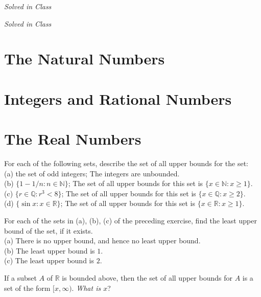 \documentclass[12pt]{book}
\newenvironment{theorem}[2][Theorem]{\begin{trivlist}
\item[\hskip \labelsep {\bfseries #1}\hskip \labelsep {\bfseries #2.}]}{\end{trivlist}}
\newenvironment{exercise}[2][Exercise]{\begin{trivlist}
\item[\hskip \labelsep {\bfseries #1}\hskip \labelsep {\bfseries #2.}]}{\end{trivlist}}
\begin{document}
\begin{exercise}{1.1.14}
\emph{Solved in Class}
\end{exercise}

\begin{exercise}{1.1.15}
\emph{Solved in Class}
\end{exercise}


\section{The Natural Numbers}
\section{Integers and Rational Numbers}

\section{The Real Numbers}


\begin{exercise}{1.4.1}
For each of the following sets, describe the set of all upper bounds for the set: \\
(a) the set of odd integers; The integers are unbounded.\\
(b) $\{1 - 1/n : n \in \mathbb{N}\}$; The set of all upper bounds for this set is $\{x \in \mathbb{N}: x \geq 1\}$. \\
(c) $\{r \in \mathbb{Q}: r^3 < 8\}$; The set of all upper bounds for this set is $\{x \in \mathbb{Q}: x \geq 2\}$.\\
(d) $\{ \sin x : x \in \mathbb{R}\}$; The set of all upper bounds for this set is $\{x \in \mathbb{R}: x \geq 1\}$.
\end{exercise}



\begin{exercise}{1.4.2}
For each of the sets in (a), (b), (c) of the preceding exercise, find the least upper bound of the set, if it exists.\\

(a) There is no upper bound, and hence no least upper bound. \\
(b) The least upper bound is $1$.\\
(c) The least upper bound is $2$.
\end{exercise}



\begin{theorem}{1.4.3}
If a subset $A$ of $\mathbb{R}$ is bounded above, then the set of all upper bounds for $A$ is a set of the form $[x, \infty)$. \emph{What is $x$}?
\end{theorem}
\end{document}
